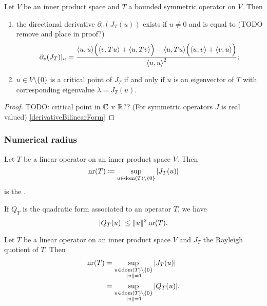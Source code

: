 \begin{lemma}
Let $V$ be an inner product space and $T$ a bounded symmetric operator on $V$. Then
\begin{enumerate}
\item the directional derivative $\partial_v(J_T(u))$ exists if $u\neq 0$ and is equal to (TODO remove and place in proof?)
\[ \partial_v(J_T)|_u = \frac{\inner{u,u}\Big( \inner{v,Tu} + \inner{u,Tv} \Big) - \inner{u,Tu}\Big(\inner{u,v}+\inner{v,u}\Big)}{\inner{u,u}^2}; \]
\item $u\in V\setminus \{ 0 \}$ is a critical point of $J_T$ \textup{if and only if} $u$ is an eigenvector of $T$ with corresponding eigenvalue $\lambda = J_T(u)$.
\end{enumerate}
\end{lemma}
\begin{proof}
TODO: critical point in $\mathbb{C}$ v $\mathbb{R}$?? (For symmetric operators $J$ is real valued)
\ref{derivativeBilinearForm}
\end{proof}

\subsubsection{Numerical radius}
\begin{definition}
Let $T$ be a linear operator on an inner product space $V$. Then
\[ \operatorname{nr}(T) \coloneqq \sup_{u\in \operatorname{dom}(T)\setminus\{0\}} |J_T(u)| \]
is the .
\end{definition}
If $Q_T$ is the quadratic form associated to an operator $T$, we have
\[ |Q_T(u)| \leq \lVert u\rVert^2\operatorname{nr}(T). \]

\begin{lemma}
Let $T$ be a linear operator on an inner product space $V$ and $J_T$ the Rayleigh quotient of $T$. Then
\begin{align*}
\operatorname{nr}(T) &= \sup_{\substack{u\in \operatorname{dom}(T) \setminus\{0\}\\ \lVert u\rVert = 1}} |J_T(u)| \\
&= \sup_{\substack{u\in \operatorname{dom}(T) \setminus\{0\}\\ \lVert u\rVert = 1}} |Q_T(u)|.
\end{align*}
\end{lemma}

